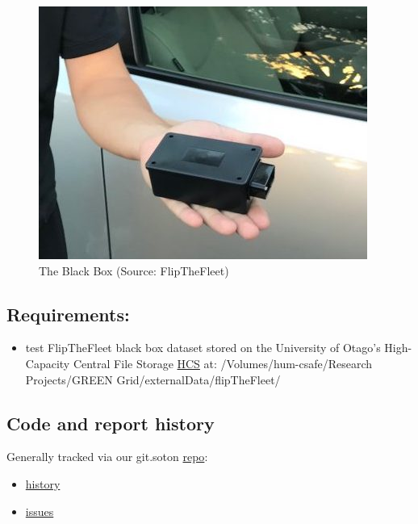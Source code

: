 \documentclass[]{article}
\providecommand{\tightlist}{%
  \setlength{\itemsep}{0pt}\setlength{\parskip}{0pt}}
\begin{document}
\begin{figure}

\hfill{}\includegraphics[width=4.24in]{fig/bb} 

\caption{The Black Box (Source: FlipTheFleet)}\label{fig:blackBox}
\end{figure}

\subsection{Requirements:}\label{requirements}

\begin{itemize}
\tightlist
\item
  test FlipTheFleet black box dataset stored on the University of
  Otago's High-Capacity Central File Storage
  \href{https://www.otago.ac.nz/its/services/hosting/otago068353.html}{HCS}
  at: /Volumes/hum-csafe/Research Projects/GREEN
  Grid/externalData/flipTheFleet/
\end{itemize}

\subsection{Code and report history}\label{code-and-report-history}

Generally tracked via our git.soton
\href{https://git.soton.ac.uk/ba1e12/nzGREENGrid}{repo}:

\begin{itemize}
\tightlist
\item
  \href{https://git.soton.ac.uk/ba1e12/nzGREENGrid/commits/master}{history}
\item
  \href{https://git.soton.ac.uk/ba1e12/nzGREENGrid/issues}{issues}
\end{itemize}
\end{document}
